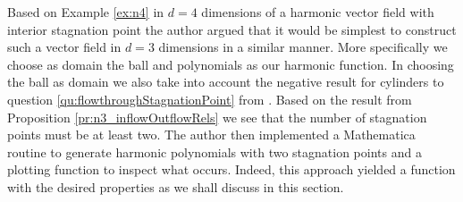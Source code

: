 Based on Example \ref{ex:n4} in $d=4$ dimensions of a harmonic vector field with interior stagnation point
the author argued that it would be simplest to construct such a vector field in $d=3$ dimensions in a similar manner.
More specifically we choose as domain the ball and polynomials as our harmonic function. 
In choosing the ball as domain we also take into account the negative result for cylinders to question \ref{qu:flowthroughStagnationPoint} from \cite[§6]{Douglas2020}.
Based on the result from Proposition \ref{pr:n3_inflowOutflowRels} we see that the number of stagnation
points must be at least two.
The author then implemented a Mathematica routine to generate harmonic polynomials
with two stagnation points and a plotting function to inspect what occurs.
Indeed, this approach yielded a function with the desired properties as
we shall discuss in this section.
